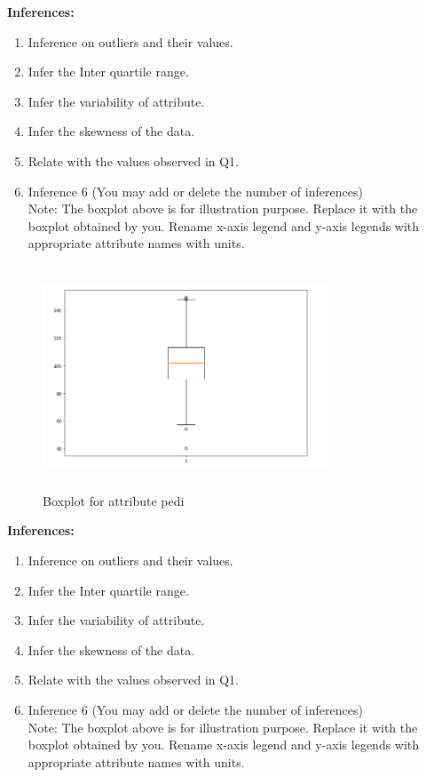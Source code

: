 \documentclass[12 pt, a4paper]{article}
\theoremstyle{definition}
\begin{document}
\textbf{\Large Inferences:}
\begin{enumerate}
   \item Inference on outliers and their values.
   \item Infer the Inter quartile range.
   \item Infer the variability of attribute.
   \item Infer the skewness of the data.
 \item Relate with the values observed in Q1. \item Inference 6 (You may add or delete the number of inferences)
\\Note: The boxplot above is for illustration purpose. Replace it with the boxplot obtained by you. Rename x-axis legend and y-axis legends with appropriate attribute names with units.

\end{enumerate}

\begin{figure}[H]
	\centering
	\includegraphics[width=8.5cm,height=6.65cm]{boxplot.png}
	\caption{Boxplot for attribute pedi}
	\label{Blockdia}
\end{figure}

\textbf{\Large Inferences:}
\begin{enumerate}
   \item Inference on outliers and their values.
   \item Infer the Inter quartile range.
   \item Infer the variability of attribute.
   \item Infer the skewness of the data.
 \item Relate with the values observed in Q1. \item Inference 6 (You may add or delete the number of inferences)
\\Note: The boxplot above is for illustration purpose. Replace it with the boxplot obtained by you. Rename x-axis legend and y-axis legends with appropriate attribute names with units.

\end{enumerate}
\end{document}
